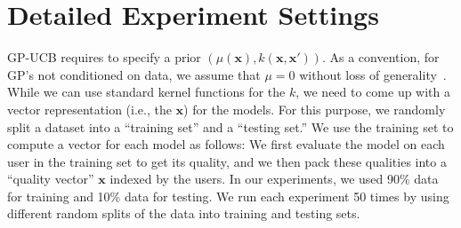 \documentclass[letterpaper]{vldb}
\newcommand{\eml}{\texttt{ease.ml}\xspace}
\begin{document}
%






  



%
%
%
%
%
%
%
%
%
%
%
%
%
%
%
%
%
%
%
%
%
%
%
%
%
%
%
%
%
%
%
%
%
%
%
%
%
%
%
%
%
%
%
%
%
%



\iffalse

\appendix


\section{Detailed Experiment Settings}

GP-UCB requires to specify a prior $(\mu(\mathbf{x}), k(\mathbf{x},\mathbf{x}'))$.
As a convention, for GP's not conditioned on data, we assume that $\mu=0$ without loss of generality~\cite{SrinivasKKS10}.
While we can use standard kernel functions for the $k$, we need to come up with a vector representation (i.e., the $\mathbf{x}$) for the models.
For this purpose, we randomly split a dataset into a ``training set'' and a ``testing set.''
We use the training set to compute a vector for each model as follows:
We first evaluate the model on each user in the training set to get its quality, and we then pack these qualities into a ``quality vector'' $\mathbf{x}$ indexed by the users.
In our experiments, we used 90\% data for training and 10\% data for testing.
We run each experiment 50 times by using different random splits of the data into training and testing sets.
\end{document}
